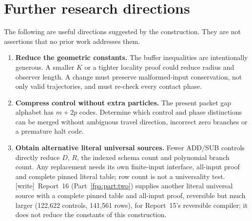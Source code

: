 \documentclass[11pt,a4paper]{article}
\numberwithin{equation}{section}
\newcommand{\wtag}{\textup{[write]}}
\begin{document}
\section{Further research directions}\label{fpa:rep:14:last}\label{fpa:bc:sec:questions}
The following are useful directions suggested by the construction. They are
not assertions that no prior work addresses them.
\begin{enumerate}
\item \textbf{Reduce the geometric constants.} The buffer inequalities are
intentionally generous. A smaller $K$ or a tighter locality proof could reduce
radius and observer length. A change must preserve malformed-input conservation,
not only valid trajectories, and must re-check every contact phase.
\item \textbf{Compress control without extra particles.} The present packet
gap alphabet has $m+2p$ codes. Determine which control and phase distinctions
can be merged without ambiguous travel direction, incorrect zero branches
or a premature halt code.
\item \textbf{Obtain alternative literal universal sources.} Fewer ADD/SUB
controls directly reduce $D$, $R$, the indexed schema count and polynomial
branch count. Any replacement needs its own finite-input interface, all-input
proof and complete pinned literal table; row count is not a universality test.
\wtag\ Report~16 (Part~\ref{fpa:part:two}) supplies another literal universal source with a complete pinned table and all-input proof, reversible but much larger (122,622 controls, 141,561 rows), for Report~15's reversible compiler; it does not reduce the constants of this construction.


\end{enumerate}
\end{document}
